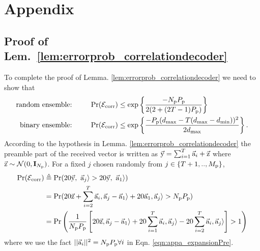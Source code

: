 \section{Appendix}
\subsection{Proof of Lem.~\ref{lem:errorprob_correlationdecoder}}
\label{appendix:proof_errorprob_correlationdecoder}

To complete the proof of Lemma. \ref{lem:errorprob_correlationdecoder} we need to show that 
\begin{align*}
\text{random ensemble:}\qquad ~~&\mathrm{Pr}(\mathcal{E}_{\text{corr}})\leq \exp\left\lbrace\frac{-N_{\mathrm{p}}P_{\mathrm{p}}}{2(2+(2T-1)P_{\mathrm{p}})}\right\rbrace\\
\text{binary ensemble:}\qquad ~~&\mathrm{Pr}(\mathcal{E}_{\text{corr}})\leq \exp\left\lbrace\frac{-P_{\mathrm{p}}(d_{\mathrm{max}}-T(d_{\mathrm{max}}-d_{\mathrm{min}}))^2}{2d_{\mathrm{max}}}\right\rbrace.
\end{align*}
According to the hypothesis in Lemma. \ref{lem:errorprob_correlationdecoder} the preamble part of the received vector is written as $\vec{\mathrm{y}}=\sum_{i=1}^{T}\vec{\mathrm{a}}_i+\vec{\mathrm{z}}$ where $\vec{\mathrm{z}}\sim\mathcal{N}(0,\mathbf{I}_{N_{\mathrm{p}}})$.	 For a fixed $j$ chosen randomly from $j\in\{T+1,..,M_{\mathrm{p}}\}$, 
\begin{align}
\mathrm{Pr}(\mathcal{E}_{\text{corr}})&\triangleq \mathrm{Pr}(20\vec{\mathrm{y}},~\vec{\mathrm{a}}_j\rangle >20\vec{\mathrm{y}},~\vec{\mathrm{a}}_1\rangle) \label{eqn:appa_probdefinition}\\
&=\mathrm{Pr}(20\vec{\mathrm{z}}+\sum_{i=2}^{T}\vec{\mathrm{a}}_i,\vec{\mathrm{a}}_j-\vec{\mathrm{a}}_1\rangle+20\vec{\mathrm{a}}_1,\vec{\mathrm{a}}_j\rangle >N_{\mathrm{p}}P_{\mathrm{p}})\label{eqn:appa_expansionPre}\\
&=\mathrm{Pr}\left(\frac{1}{N_{\mathrm{p}}P_{\mathrm{p}}}\left[20\vec{\mathrm{z}},\vec{\mathrm{a}}_j-\vec{\mathrm{a}}_1\rangle+20\sum_{i=1}^{T}\vec{\mathrm{a}}_i,\vec{\mathrm{a}}_j\rangle-20\sum_{i=2}^{T}  \vec{\mathrm{a}}_i,\vec{\mathrm{a}}_j\rangle\right] >1\right)\label{eqn:appa_finalexpansionPre}
\end{align}
where we use the fact $||\vec{\mathrm{a}}_i||^2=N_{\mathrm{p}}P_{\mathrm{p}}\forall i$ in Eqn. \eqref{eqn:appa_expansionPre}.

